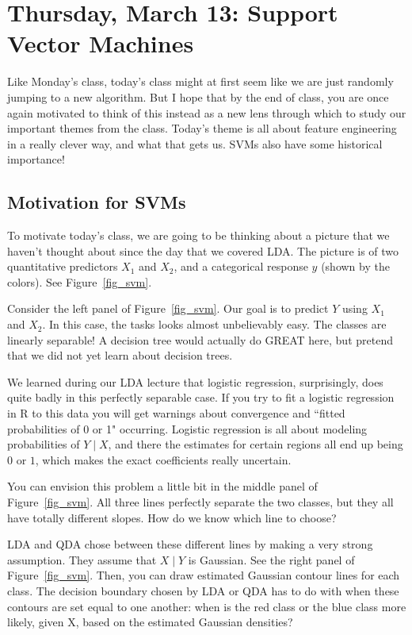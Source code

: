 \section{Thursday, March 13: Support Vector Machines}

Like Monday's class, today's class might at first seem like we are just randomly jumping to a new algorithm. But I hope that by the end of class, you are once again motivated to think of this instead as a new lens through which to study our important themes from the class. Today's theme is all about feature engineering in a really clever way, and what that gets us. SVMs also have some historical importance! 

\subsection{Motivation for SVMs}

To motivate today's class, we are going to be thinking about a picture that we haven't thought about since the day that we covered LDA. The picture is of two quantitative predictors $X_1$ and $X_2$, and a categorical response $y$ (shown by the colors). See Figure~\ref{fig_svm}.

Consider the left panel of Figure~\ref{fig_svm}. Our goal is to predict $Y$ using $X_1$ and $X_2$. In this case, the tasks looks almost unbelievably easy. The classes are linearly separable! A decision tree would actually do GREAT here, but pretend that we did not yet learn about decision trees. 

We learned during our LDA lecture that logistic regression, surprisingly, does quite badly in this perfectly separable case. If you try to fit a logistic regression in R to this data you will get warnings about convergence and ``fitted probabilities of 0 or 1" occurring. Logistic regression is all about modeling probabilities of $Y \mid X$, and there the estimates for certain regions all end up being $0$ or $1$, which makes the exact coefficients really uncertain. 

You can envision this problem a little bit in the middle panel of Figure~\ref{fig_svm}. All three lines perfectly separate the two classes, but they all have totally different slopes. How do we know which line to choose?

LDA and QDA chose between these different lines by making a very strong assumption. They assume that $X \mid Y$ is Gaussian. See the right panel of Figure~\ref{fig_svm}. Then, you can draw estimated Gaussian contour lines for each class. The decision boundary chosen by LDA or QDA has to do with when these contours are set equal to one another: when is the red class or the blue class more likely, given X, based on the estimated Gaussian densities?  

